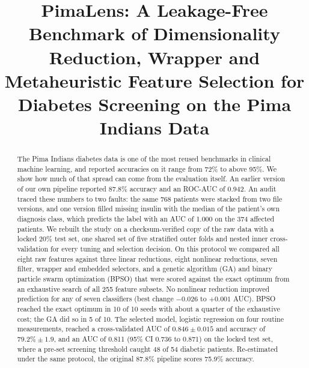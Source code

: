 \documentclass[conference]{IEEEtran}
\begin{document}
\title{PimaLens: A Leakage-Free Benchmark of Dimensionality Reduction, Wrapper and Metaheuristic Feature Selection for Diabetes Screening on the Pima Indians Data}

\author{
}

\maketitle

\begin{abstract}
The Pima Indians diabetes data is one of the most reused benchmarks in clinical machine learning, and reported accuracies on it range from 72\% to above 95\%. We show how much of that spread can come from the evaluation itself. An earlier version of our own pipeline reported 87.8\% accuracy and an ROC-AUC of 0.942. An audit traced these numbers to two faults: the same 768 patients were stacked from two file versions, and one version filled missing insulin with the median of the patient's own diagnosis class, which predicts the label with an AUC of 1.000 on the 374 affected patients. We rebuilt the study on a checksum-verified copy of the raw data with a locked 20\% test set, one shared set of five stratified outer folds and nested inner cross-validation for every tuning and selection decision. On this protocol we compared all eight raw features against three linear reductions, eight nonlinear reductions, seven filter, wrapper and embedded selectors, and a genetic algorithm (GA) and binary particle swarm optimization (BPSO) that were scored against the exact optimum from an exhaustive search of all 255 feature subsets. No nonlinear reduction improved prediction for any of seven classifiers (best change $-0.026$ to $+0.001$ AUC). BPSO reached the exact optimum in 10 of 10 seeds with about a quarter of the exhaustive cost; the GA did so in 5 of 10. The selected model, logistic regression on four routine measurements, reached a cross-validated AUC of $0.846\pm0.015$ and accuracy of $79.2\%\pm1.9$, and an AUC of 0.811 (95\% CI 0.736 to 0.871) on the locked test set, where a pre-set screening threshold caught 48 of 54 diabetic patients. Re-estimated under the same protocol, the original 87.8\% pipeline scores 75.9\% accuracy.
\end{abstract}
\end{document}
